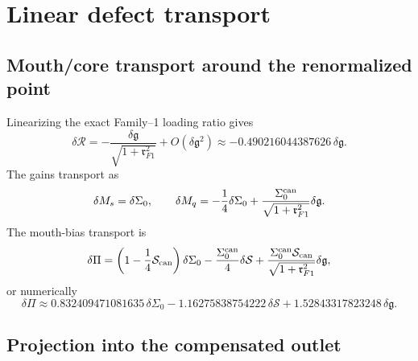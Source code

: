 \section{Linear defect transport}
\label{sec:part04_geometry_retarded_mouth:linear-defect-transport}

\subsection{Mouth/core transport around the renormalized point}
\label{subsec:part04-linear-mouth-core-transport}

Linearizing the exact Family--1 loading ratio gives
\begin{equation}
\label{eq:part04-deltaR-deltag}
\delta\mathcal R
=-\frac{\delta\mathfrak g}{\sqrt{1+\mathfrak r_{F1}^2}}+O(\delta\mathfrak g^2)
\approx -0.490216044387626\,\delta\mathfrak g.
\end{equation}
The gains transport as
\begin{equation}
\label{eq:part04-deltaMsMq}
\delta M_s=\delta\Sigma_0,
\qquad
\delta M_q=-\frac14\delta\Sigma_0+\frac{\Sigma_0^{\rm can}}{\sqrt{1+\mathfrak r_{F1}^2}}\delta\mathfrak g.
\end{equation}
The mouth-bias transport is
\begin{equation}
\label{eq:part04-deltaPi-transport}
\delta\Pi
=
\left(1-\frac14\mathcal S_{\rm can}\right)\delta\Sigma_0
-\frac{\Sigma_0^{\rm can}}{4}\delta\mathcal S
+
\frac{\Sigma_0^{\rm can}\mathcal S_{\rm can}}{\sqrt{1+\mathfrak r_{F1}^2}}\delta\mathfrak g,
\end{equation}
or numerically
\begin{equation}
\label{eq:part04-deltaPi-numeric}
\delta\Pi
\approx
0.832409471081635\,\delta\Sigma_0
-1.16275838754222\,\delta\mathcal S
+1.52843317823248\,\delta\mathfrak g.
\end{equation}

\subsection{Projection into the compensated outlet}
\label{subsec:part04-projection-compensated-outlet}

